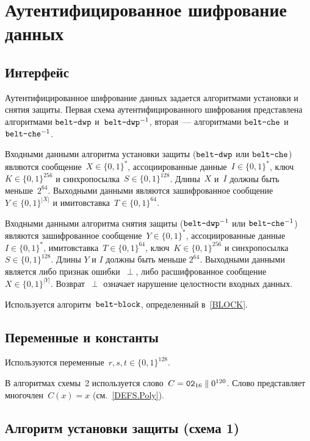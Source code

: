 \section{Аутентифицированное шифрование данных}\label{AE}

\subsection{Интерфейс}\label{AE.IFace}

Аутентифицированное шифрование данных задается алгоритмами установки 
и снятия защиты. Первая схема аутентифицированного шифрования
представлена алгоритмами $\texttt{belt-dwp}$ и~$\texttt{belt-dwp}^{-1}$,
вторая~--- алгоритмами $\texttt{belt-che}$ и~$\texttt{belt-che}^{-1}$. 

Входными данными алгоритма установки защиты ($\texttt{belt-dwp}$ или
$\texttt{belt-che}$) являются сообщение~$X\in\{0,1\}^*$, ассоциированные
данные~$I\in\{0,1\}^*$, ключ~$K\in\{0,1\}^{256}$ и 
синхропосылка~$S\in\{0,1\}^{128}$. Длины~$X$ и~$I$ должны быть меньше~$2^{64}$. 
%
Выходными данными являются зашифрованное сообщение~$Y\in\{0,1\}^{|X|}$
и имитовставка~$T\in\{0,1\}^{64}$.

Входными данными алгоритма снятия защиты ($\texttt{belt-dwp}^{-1}$ или
$\texttt{belt-che}^{-1}$) являются зашифрованное
сообщение~$Y\in\{0,1\}^*$, ассоциированные данные~$I\in\{0,1\}^*$,
имитовставка~$T\in\{0,1\}^{64}$, ключ~$K\in\{0,1\}^{256}$ и синхропосылка
$S\in\{0,1\}^{128}$.
%
Длины $Y$ и $I$ должны быть меньше $2^{64}$.
%
Выходными данными является либо признак ошибки~$\perp$, либо расшифрованное 
сообщение~$X\in\{0,1\}^{|Y|}$. 
%
Возврат~$\perp$ означает нарушение целостности входных данных.

Используется алгоритм~$\texttt{belt-block}$, 
определенный в~\ref{BLOCK}.

\subsection{Переменные и константы}\label{AE.Vars}

Используются переменные~$r,s,t\in\{0,1\}^{128}$.

В алгоритмах схемы~2 используется слово~$C=\texttt{02}_{16}\parallel 0^{120}$.
Слово представляет многочлен~$C(x)=x$ (см.~\ref{DEFS.Poly}).

\subsection{Алгоритм установки защиты (схема 1)}\label{AE.DWP.Wrap}

